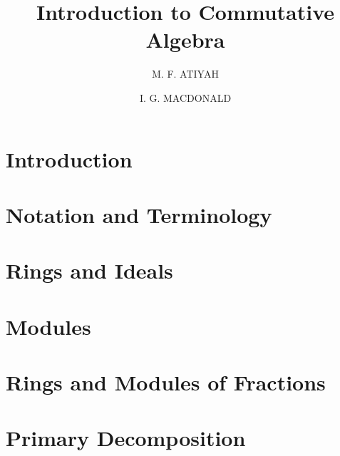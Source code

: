 \documentclass{book}
\title{Introduction to Commutative Algebra}
\author{M. F. ATIYAH \and I. G. MACDONALD}
\theoremstyle{definition}
\theoremstyle{remark}
\begin{document}
\frontmatter
\maketitle
\chapter{Introduction}
\chapter{Notation and Terminology}
\tableofcontents
\mainmatter
\chapter{Rings and Ideals}
\chapter{Modules}
\chapter{Rings and Modules of Fractions}
\chapter{Primary Decomposition}

\end{document}
